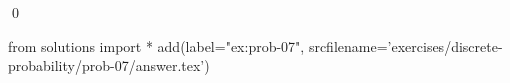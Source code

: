 
\begin{ex} 
  \label{ex:prob-07}
  
  \qed
\end{ex} 
\begin{python0}
from solutions import *
add(label="ex:prob-07",
    srcfilename='exercises/discrete-probability/prob-07/answer.tex') 
\end{python0}
